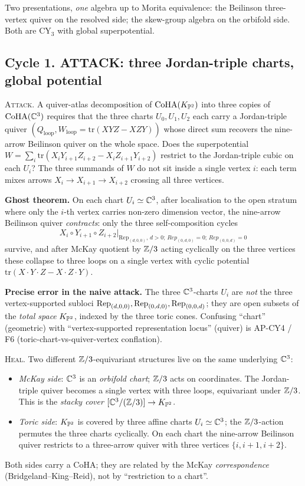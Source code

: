 Two presentations, \emph{one} algebra up to Morita equivalence: the
Beilinson three-vertex quiver on the resolved side; the skew-group
algebra on the orbifold side. Both are CY$_3$ with global superpotential.

\subsection*{Cycle 1. ATTACK: three Jordan-triple charts, global potential}

\textsc{Attack.} A quiver-atlas decomposition of $\mathrm{CoHA}(K_{\mathbb{P}^2})$ into
three copies of $\mathrm{CoHA}(\mathbb{C}^3)$ requires that the three charts
$U_0,U_1,U_2$ each carry a Jordan-triple quiver $(Q_{\mathrm{loop}},
W_{\mathrm{loop}}=\mathrm{tr}(XYZ-XZY))$ whose direct sum recovers the
nine-arrow Beilinson quiver on the whole space. Does the superpotential
$W=\sum_i\mathrm{tr}(X_iY_{i+1}Z_{i+2}-X_iZ_{i+1}Y_{i+2})$ restrict to
the Jordan-triple cubic on each $U_i$? The three summands of $W$ do not
sit inside a single vertex $i$: each term mixes arrows
$X_i\to X_{i+1}\to X_{i+2}$ crossing all three vertices.

\textbf{Ghost theorem.} On each chart $U_i\simeq\mathbb{C}^3$, after
localisation to the open stratum where only the $i$-th vertex carries
non-zero dimension vector, the nine-arrow Beilinson quiver
\emph{contracts}: only the three self-composition cycles
\[
X_i\circ Y_{i+1}\circ Z_{i+2}\big|_{\mathrm{Rep}_{(d,0,0)},
\,d>0;\,Rep_{(0,d,0)}=0;\,Rep_{(0,0,d)}=0}
\]
survive, and after McKay quotient by $\mathbb{Z}/3$ acting cyclically on the
three vertices these collapse to three loops on a single vertex with
cyclic potential $\mathrm{tr}(X\cdot Y\cdot Z-X\cdot Z\cdot Y)$.

\textbf{Precise error in the naive attack.} The three
$\mathbb{C}^3$-charts $U_i$ are \emph{not} the three vertex-supported subloci
$\mathrm{Rep}_{(d,0,0)},\mathrm{Rep}_{(0,d,0)},\mathrm{Rep}_{(0,0,d)}$; they are open subsets of
the \emph{total space} $K_{\mathbb{P}^2}$, indexed by the three toric cones.
Confusing ``chart'' (geometric) with ``vertex-supported representation
locus'' (quiver) is AP-CY4 / F6 (toric-chart-vs-quiver-vertex
conflation).

\textsc{Heal.} Two different $\mathbb{Z}/3$-equivariant structures live on the
same underlying $\mathbb{C}^3$:
\begin{itemize}
\item \emph{McKay side}: $\mathbb{C}^3$ is an \emph{orbifold chart};
$\mathbb{Z}/3$ acts on coordinates. The Jordan-triple quiver becomes a single
vertex with three loops, equivariant under $\mathbb{Z}/3$. This is the
\emph{stacky cover} $[\mathbb{C}^3/(\mathbb{Z}/3)]\to K_{\mathbb{P}^2}$.
\item \emph{Toric side}: $K_{\mathbb{P}^2}$ is covered by three affine charts
$U_i\simeq\mathbb{C}^3$; the $\mathbb{Z}/3$-action permutes the three charts cyclically.
On each chart the nine-arrow Beilinson quiver restricts to a
three-arrow quiver with three vertices $\{i,i+1,i+2\}$.
\end{itemize}
Both sides carry a CoHA; they are related by the McKay \emph{correspondence}
(Bridgeland--King--Reid), not by ``restriction to a chart''.

